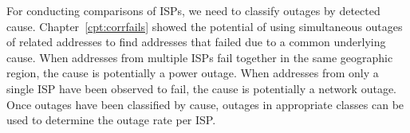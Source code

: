 For conducting comparisons of ISPs, we need to classify outages by
detected cause. Chapter~\ref{cpt:corrfails} showed the potential of
using simultaneous outages of related addresses to find addresses that
failed due to a common underlying cause. When addresses from multiple
ISPs fail together in the same geographic region, the cause is
potentially a power outage. When addresses from only a single ISP have
been observed to fail, the cause is potentially a network outage. Once
outages have been classified by cause, outages in appropriate classes
can be used to determine the outage rate per ISP.




 
